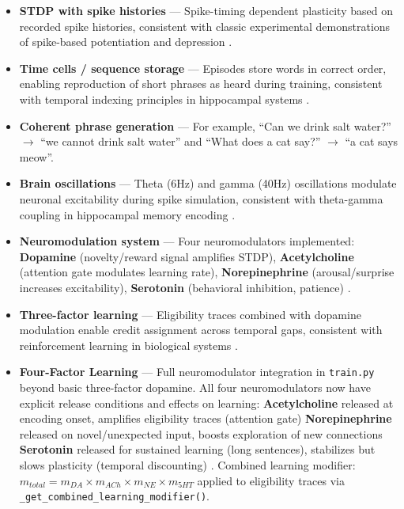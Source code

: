 \documentclass[11pt]{article}
\begin{document}
\begin{itemize}
\item \textbf{STDP with spike histories} --- Spike-timing dependent plasticity based on recorded spike histories, consistent
      with classic experimental demonstrations of spike-based potentiation and depression \citep{markram1997regulation}.
\item \textbf{Time cells / sequence storage} --- Episodes store words in correct order, enabling reproduction of short phrases
      as heard during training, consistent with temporal indexing principles in hippocampal systems \citep{spens2024generative}.
\item \textbf{Coherent phrase generation} --- For example, ``Can we drink salt water?'' $\rightarrow$ ``we cannot drink salt water''
      and ``What does a cat say?'' $\rightarrow$ ``a cat says meow''.
\item \textbf{Brain oscillations} --- Theta (6Hz) and gamma (40Hz) oscillations modulate neuronal excitability during
      spike simulation, consistent with theta-gamma coupling in hippocampal memory encoding \citep{buzsaki2006rhythms}.
\item \textbf{Neuromodulation system} --- Four neuromodulators implemented:
      \textbf{Dopamine} (novelty/reward signal amplifies STDP),
      \textbf{Acetylcholine} (attention gate modulates learning rate),
      \textbf{Norepinephrine} (arousal/surprise increases excitability),
      \textbf{Serotonin} (behavioral inhibition, patience) \citep{schultz1998predictive,dayan2002reward}.
\item \textbf{Three-factor learning} --- Eligibility traces combined with dopamine modulation enable
      credit assignment across temporal gaps, consistent with reinforcement learning in biological systems \citep{gerstner2018eligibility}.
\item \textbf{Four-Factor Learning} --- Full neuromodulator integration
      in \texttt{train.py} beyond basic three-factor dopamine. All four neuromodulators now have explicit
      release conditions and effects on learning:
      \textbf{Acetylcholine} released at encoding onset, amplifies eligibility traces (attention gate)
      \textbf{Norepinephrine} released on novel/unexpected input, boosts exploration of new connections
      \textbf{Serotonin} released for sustained learning (long sentences), stabilizes but slows plasticity
      (temporal discounting) \citep{miyazaki2014optogenetic}.
      Combined learning modifier: $m_{total} = m_{DA} \times m_{ACh} \times m_{NE} \times m_{5HT}$
      applied to eligibility traces via \texttt{\_get\_combined\_learning\_modifier()}.

\end{itemize}
\end{document}
